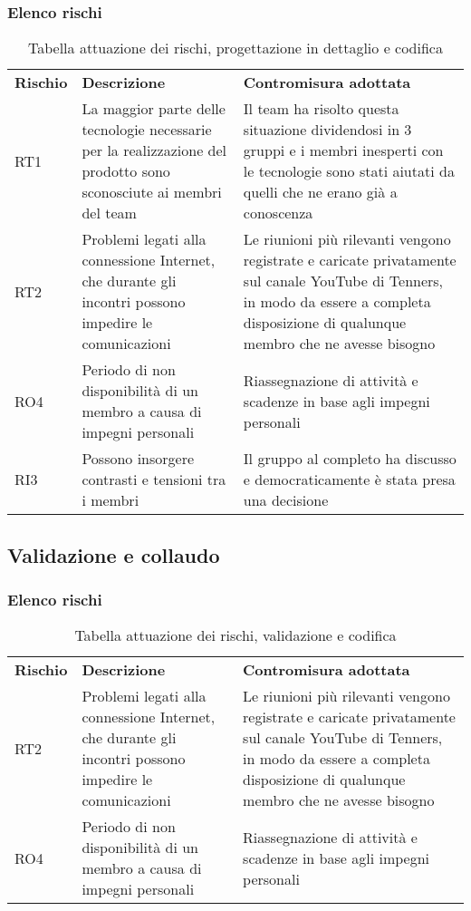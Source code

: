 \subsubsection{Elenco rischi}
\begin{longtable}{|p{2cm}|p{6cm}|p{6cm}|}
	\arrayrulecolor{white}
	\caption{Tabella attuazione dei rischi, progettazione in dettaglio e codifica} \\
	\hline
	\rowcolor{header}
	\textbf{Rischio} & \textbf{Descrizione} & \textbf{Contromisura adottata} \\
	\hline
	RT1 & La maggior parte delle tecnologie necessarie per la realizzazione del prodotto sono sconosciute ai membri del team & Il team ha risolto questa situazione dividendosi in 3 gruppi e i membri inesperti con le tecnologie sono stati aiutati da quelli che ne erano già a conoscenza\\
	RT2 & Problemi legati alla connessione Internet, che durante gli incontri possono impedire le comunicazioni & Le riunioni più rilevanti vengono registrate e caricate privatamente sul canale YouTube di Tenners, in modo da essere a completa disposizione di qualunque membro che ne avesse bisogno
	\\
	RO4 & Periodo di non disponibilità di un membro a causa di impegni personali & Riassegnazione di attività e scadenze in base agli impegni personali
	\\
	RI3 & Possono insorgere contrasti e tensioni tra i membri & Il gruppo al completo ha discusso e democraticamente è stata presa una decisione\\
	\hline
\end{longtable}


\newpage
\subsection{Validazione e collaudo}
\subsubsection{Elenco rischi}
\begin{longtable}{|p{2cm}|p{6cm}|p{6cm}|}
	\arrayrulecolor{white}
	\caption{Tabella attuazione dei rischi, validazione e codifica} \\
	\hline
	\rowcolor{header}
	\textbf{Rischio} & \textbf{Descrizione} & \textbf{Contromisura adottata} \\
	\hline
	RT2 & Problemi legati alla connessione Internet, che durante gli incontri possono impedire le comunicazioni & Le riunioni più rilevanti vengono registrate e caricate privatamente sul canale YouTube di Tenners, in modo da essere a completa disposizione di qualunque membro che ne avesse bisogno
	\\
	RO4 & Periodo di non disponibilità di un membro a causa di impegni personali & Riassegnazione di attività e scadenze in base agli impegni personali\\
	\hline
\end{longtable}